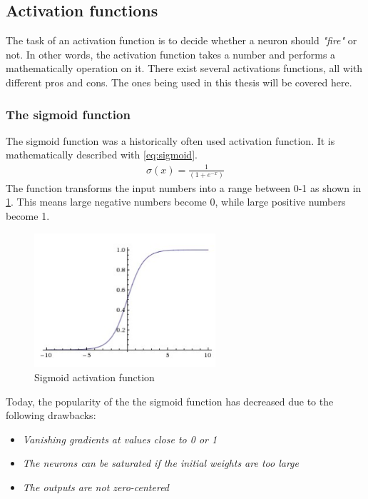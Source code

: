 \documentclass[USenglish]{ifimaster}  %
\begin{document}
\subsection{Activation functions}
The task of an activation function is to decide whether a neuron should \textit{"fire"} or not. In other words, the activation function takes a number and performs a mathematically operation on it. There exist several activations functions, all with different pros and cons. The ones being used in this thesis will be covered here.
\subsubsection{The sigmoid function}
The sigmoid function was a historically often used activation function. It is mathematically described with \cref{eq:sigmoid}.
\begin{equation}\label{eq:sigmoid}
\begin{aligned}
\sigma(x) = \frac{1}{(1 + e^{-x})}
\end{aligned}
\end{equation}
The function transforms the input numbers into a range between 0-1 as shown in \cref{fig:sigmoid}. This means large negative numbers become 0, while large positive numbers become 1.
\begin{figure}[H]
    \centering
    \includegraphics[width=0.6\textwidth]{bilder/sigmoid_function.png}
    \caption{Sigmoid activation function \cite{website:cs231n_activation_functions}}
    \label{fig:sigmoid}
\end{figure}
Today, the popularity of the the sigmoid function has decreased due to the following drawbacks:
\begin{itemize}
    \item \textit{Vanishing gradients at values close to 0 or 1}
    \item \textit{The neurons can be saturated if the initial weights are too large}
    \item \textit{The outputs are not zero-centered}
\end{itemize}
\end{document}
